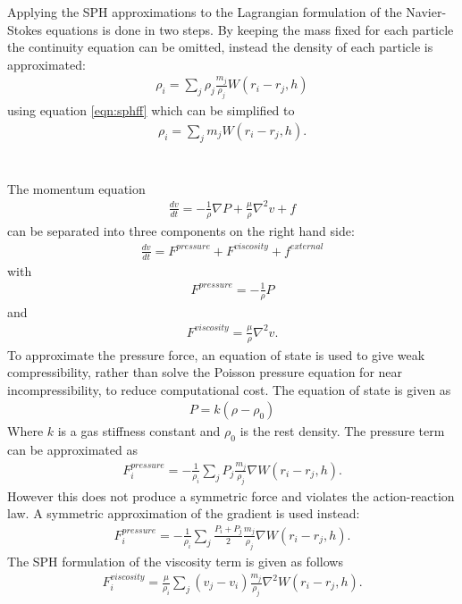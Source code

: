 Applying the SPH approximations to the Lagrangian formulation of the
Navier-Stokes equations is done in two steps. By keeping the mass fixed for each
particle the continuity equation can be omitted, instead the density of each particle is approximated:
\begin{align}
\rho_i = \sum_j \rho_j \frac{m_j}{\rho_j} W(r_i - r_j, h)
\end{align}
using equation \ref{eqn:sphff} which can be simplified to
\begin{align}
\label{eqn:sphdens}
\rho_i = \sum_j m_j W(r_i - r_j, h).
\end{align}
\\
\\
The momentum equation
\begin{align}
\frac{dv}{dt} = -\frac{1}{\rho}\nabla P + \frac{\mu}{\rho} \nabla^2 v + f
\end{align}
can be separated into three components on the right hand side:
\begin{align} \frac{dv}{dt} = F^{pressure} + F^{viscosity} + f^{external} \end{align}
with
\begin{align}
F^{pressure} = -\frac{1}{\rho}P
\end{align}
and
\begin{align}
F^{viscosity} = \frac{\mu}{\rho} \nabla^2 v.
\end{align}
To approximate the pressure force, an equation of state is used to give weak
compressibility, rather than solve the Poisson pressure equation for near
incompressibility, to reduce computational cost.
The equation of state is given as 
\begin{align}
P = k(\rho - \rho_0)
\end{align}
Where $k$ is a gas stiffness constant and $\rho_0$ is the rest density.
The pressure term can be approximated as
\begin{align}
F^{pressure}_i = -\frac{1}{\rho_i} \sum_j P_j \frac{m_j}{\rho_j} \nabla W(r_i - r_j, h).
\end{align}
However this does not produce a symmetric force and violates the action-reaction law. A symmetric approximation of the gradient is used instead:
\begin{align}
F^{pressure}_i = -\frac{1}{\rho_i} \sum_j \frac{P_i + P_j}{2} \frac{m_j}{\rho_j} \nabla W(r_i - r_j, h).
\end{align}
The SPH formulation of the viscosity term is given as follows
\begin{align}
F^{viscosity}_i = \frac{\mu}{\rho_i} \sum_j (v_j - v_i) \frac{m_j}{\rho_j} \nabla^2 W(r_i - r_j, h).
\end{align}


